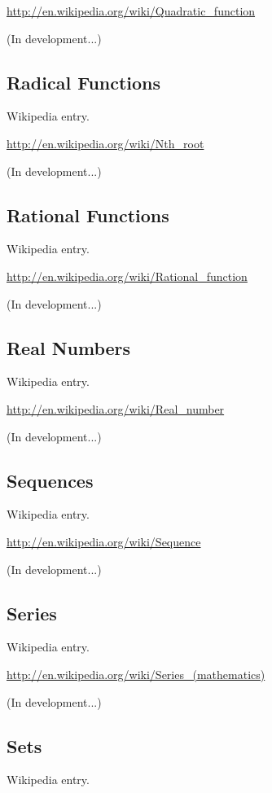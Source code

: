 \documentclass[12pt,twoside]{book}
\begin{document}
\href{http://en.wikipedia.org/wiki/Quadratic_function}{http://en.wikipedia.org/wiki/Quadratic\_function}

(In development...)

\subsection[Radical Functions]{Radical Functions}
Wikipedia entry.

\href{http://en.wikipedia.org/wiki/Nth_root}{http://en.wikipedia.org/wiki/Nth\_root}

(In development...)

\subsection[Rational Functions]{Rational
Functions}
Wikipedia entry.

\href{http://en.wikipedia.org/wiki/Rational_function}{http://en.wikipedia.org/wiki/Rational\_function}

(In development...)

\subsection[Real Numbers]{Real Numbers}
Wikipedia entry.

\href{http://en.wikipedia.org/wiki/Real_number}{http://en.wikipedia.org/wiki/Real\_number}

(In development...)

\subsection[Sequences]{Sequences}
Wikipedia entry.

\href{http://en.wikipedia.org/wiki/Sequence}{http://en.wikipedia.org/wiki/Sequence}

(In development...)

\subsection[Series]{Series}
Wikipedia entry.

\href{http://en.wikipedia.org/wiki/Series_(mathematics)}{http://en.wikipedia.org/wiki/Series\_(mathematics)}

(In development...)

\subsection[Sets]{Sets}
Wikipedia entry.
\end{document}
